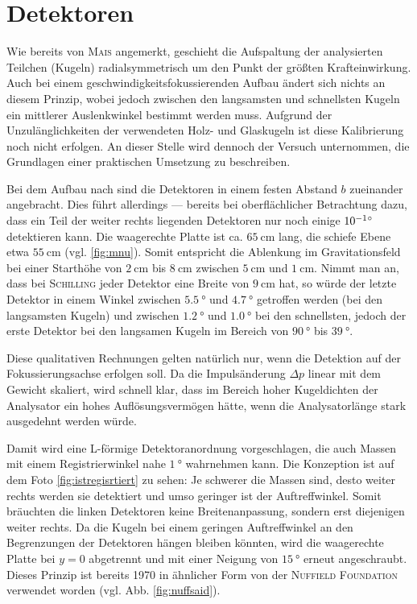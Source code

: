 

\section{Detektoren}



Wie bereits von \textsc{Mais} angemerkt, geschieht die Aufspaltung der analysierten Teilchen (Kugeln) radialsymmetrisch um den Punkt der größten Krafteinwirkung. Auch bei einem geschwindigkeitsfokussierenden Aufbau ändert sich nichts an diesem Prinzip, wobei jedoch zwischen den langsamsten und schnellsten Kugeln ein mittlerer Auslenkwinkel bestimmt werden muss. Aufgrund der Unzulänglichkeiten der verwendeten Holz- und Glaskugeln ist diese Kalibrierung noch nicht erfolgen.
An dieser Stelle wird dennoch der Versuch unternommen, die Grundlagen einer praktischen Umsetzung zu beschreiben.


Bei dem Aufbau nach \textcite{Schilling1987} sind die Detektoren in einem festen Abstand $b$ zueinander angebracht. Dies führt allerdings --- bereits bei oberflächlicher Betrachtung dazu, dass ein Teil der weiter rechts liegenden Detektoren nur noch einige $\SI{E-1}{\degree}$ detektieren kann. Die waagerechte Platte ist ca. $\SI{65}{\centi\metre}$ lang, die schiefe Ebene etwa $\SI{55}{\centi\metre}$ (vgl. \ref{fig:mnu}). Somit entspricht die Ablenkung im Gravitationsfeld bei einer Starthöhe von $\SI{2}{\centi\metre}$ bis $\SI{8}{\centi\metre}$ zwischen $\SI{5}{\centi\metre}$ und $\SI{1}{\centi\metre}$. Nimmt man an, dass bei \textsc{Schilling} jeder Detektor eine Breite von $\SI{9}{\centi\metre}$ hat, so würde der letzte Detektor in einem Winkel zwischen $\SI{5.5}{\degree}$ und $\SI{4.7}{\degree}$ getroffen werden (bei den langsamsten Kugeln) und zwischen $\SI{1.2}{\degree}$ und $\SI{1.0}{\degree}$ bei den schnellsten, jedoch der erste Detektor bei den langsamen Kugeln im Bereich von $\SI{90}{\degree}$ bis $\SI{39}{\degree}$.

Diese qualitativen Rechnungen gelten natürlich nur, wenn die Detektion auf der Fokussierungsachse erfolgen soll. Da die Impulsänderung $\Delta p$ linear mit dem Gewicht skaliert, wird schnell klar, dass im Bereich hoher Kugeldichten der Analysator ein hohes Auflösungsvermögen hätte, wenn die Analysatorlänge stark ausgedehnt werden würde. 

Damit wird eine L-förmige Detektoranordnung vorgeschlagen, die auch Massen mit einem Registrierwinkel nahe $\SI{1}{\degree}$ wahrnehmen kann. Die Konzeption ist auf dem Foto \ref{fig:istregisrtiert} zu sehen: Je schwerer die Massen sind, desto weiter rechts werden sie detektiert und umso geringer ist der Auftreffwinkel. Somit bräuchten die linken Detektoren keine Breitenanpassung, sondern erst diejenigen weiter rechts. Da die Kugeln bei einem geringen Auftreffwinkel an den Begrenzungen der Detektoren hängen bleiben könnten, wird die waagerechte Platte bei $y=0$ abgetrennt und mit einer Neigung von $\SI{15}{\degree}$ erneut angeschraubt. Dieses Prinzip ist bereits 1970 in ähnlicher Form von der \textsc{Nuffield Foundation} verwendet worden (vgl. Abb. \ref{fig:nuffsaid}).


